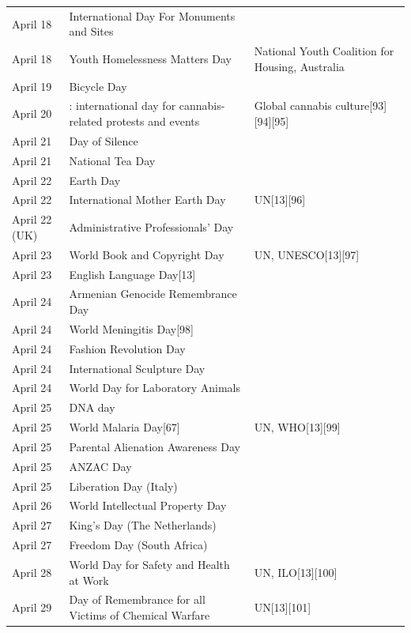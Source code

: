 \documentclass[
  openany]{book}
\begin{document}
\begin{longtable}[t]{>{\raggedright\arraybackslash}p{8em}>{\raggedright\arraybackslash}p{20em}>{\raggedright\arraybackslash}p{12em}}
April 18 & International Day For Monuments and Sites & \\
\addlinespace
\rowcolor{gray!6}  April 18 & Youth Homelessness Matters Day & National Youth Coalition for Housing, Australia\\
April 19 & Bicycle Day & \\
\rowcolor{gray!6}  April 20 & 420: international day for cannabis-related protests and events & Global cannabis culture[93][94][95]\\
April 21 & Day of Silence & \\
\rowcolor{gray!6}  April 21 & National Tea Day & \\
\addlinespace
April 22 & Earth Day & \\
\rowcolor{gray!6}  April 22 & International Mother Earth Day & UN[13][96]\\
April 22 (UK) & Administrative Professionals' Day & \\
\rowcolor{gray!6}  April 23 & World Book and Copyright Day & UN, UNESCO[13][97]\\
April 23 & English Language Day[13] & \\
\addlinespace
\rowcolor{gray!6}  April 24 & Armenian Genocide Remembrance Day & \\
April 24 & World Meningitis Day[98] & \\
\rowcolor{gray!6}  April 24 & Fashion Revolution Day & \\
April 24 & International Sculpture Day & \\
\rowcolor{gray!6}  April 24 & World Day for Laboratory Animals & \\
\addlinespace
April 25 & DNA day & \\
\rowcolor{gray!6}  April 25 & World Malaria Day[67] & UN, WHO[13][99]\\
April 25 & Parental Alienation Awareness Day & \\
\rowcolor{gray!6}  April 25 & ANZAC Day & \\
April 25 & Liberation Day (Italy) & \\
\addlinespace
\rowcolor{gray!6}  April 26 & World Intellectual Property Day & \\
April 27 & King's Day (The Netherlands) & \\
\rowcolor{gray!6}  April 27 & Freedom Day (South Africa) & \\
April 28 & World Day for Safety and Health at Work & UN, ILO[13][100]\\
\rowcolor{gray!6}  April 29 & Day of Remembrance for all Victims of Chemical Warfare & UN[13][101]\\

\end{longtable}
\end{document}
